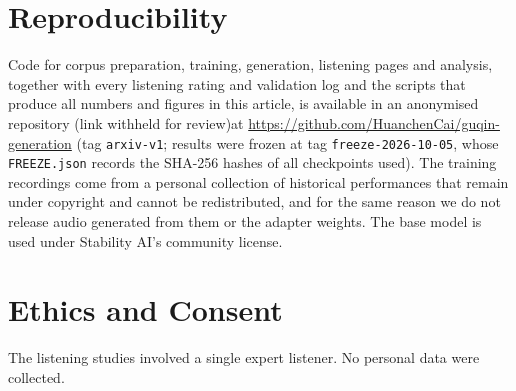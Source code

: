 \section{Reproducibility}

Code for corpus preparation, training, generation, listening pages and analysis, together with every listening
rating and validation log and the scripts that produce all numbers and figures in this article, is available
\ifdefined\anonymous in an anonymised repository (link withheld for review)\else at
\url{https://github.com/HuanchenCai/guqin-generation} (tag \texttt{arxiv-v1}; results were frozen at tag
\texttt{freeze-2026-10-05}, whose \texttt{FREEZE.json} records the SHA-256 hashes of all checkpoints used)\fi. The training recordings come from a personal collection of
historical performances that remain under copyright and cannot be redistributed, and for the same reason we do not release audio
generated from them or the adapter weights. The base model is used under Stability AI's community license.

\section{Ethics and Consent}

The listening studies involved a single expert listener. No personal data were collected.
